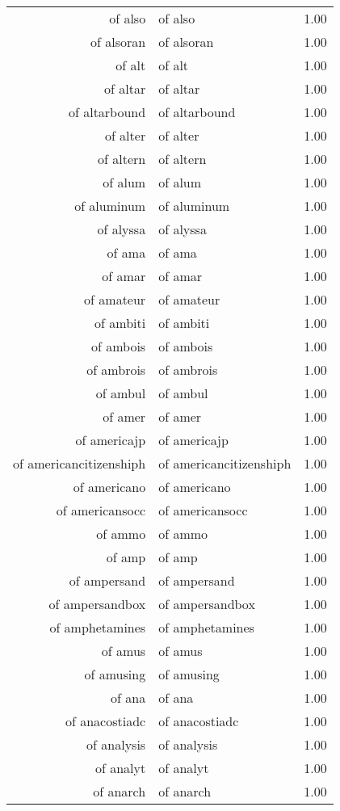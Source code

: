 \begin{table}[ht]
\begin{tabular}{rlr}
  of also & of also & 1.00 \\ 
  of alsoran & of alsoran & 1.00 \\ 
  of alt & of alt & 1.00 \\ 
  of altar & of altar & 1.00 \\ 
  of altarbound & of altarbound & 1.00 \\ 
  of alter & of alter & 1.00 \\ 
  of altern & of altern & 1.00 \\ 
  of alum & of alum & 1.00 \\ 
  of aluminum & of aluminum & 1.00 \\ 
  of alyssa & of alyssa & 1.00 \\ 
  of ama & of ama & 1.00 \\ 
  of amar & of amar & 1.00 \\ 
  of amateur & of amateur & 1.00 \\ 
  of ambiti & of ambiti & 1.00 \\ 
  of ambois & of ambois & 1.00 \\ 
  of ambrois & of ambrois & 1.00 \\ 
  of ambul & of ambul & 1.00 \\ 
  of amer & of amer & 1.00 \\ 
  of americajp & of americajp & 1.00 \\ 
  of americancitizenshiph & of americancitizenshiph & 1.00 \\ 
  of americano & of americano & 1.00 \\ 
  of americansocc & of americansocc & 1.00 \\ 
  of ammo & of ammo & 1.00 \\ 
  of amp & of amp & 1.00 \\ 
  of ampersand & of ampersand & 1.00 \\ 
  of ampersandbox & of ampersandbox & 1.00 \\ 
  of amphetamines & of amphetamines & 1.00 \\ 
  of amus & of amus & 1.00 \\ 
  of amusing & of amusing & 1.00 \\ 
  of ana & of ana & 1.00 \\ 
  of anacostiadc & of anacostiadc & 1.00 \\ 
  of analysis & of analysis & 1.00 \\ 
  of analyt & of analyt & 1.00 \\ 
  of anarch & of anarch & 1.00 \\ 

\end{tabular}
\end{table}
